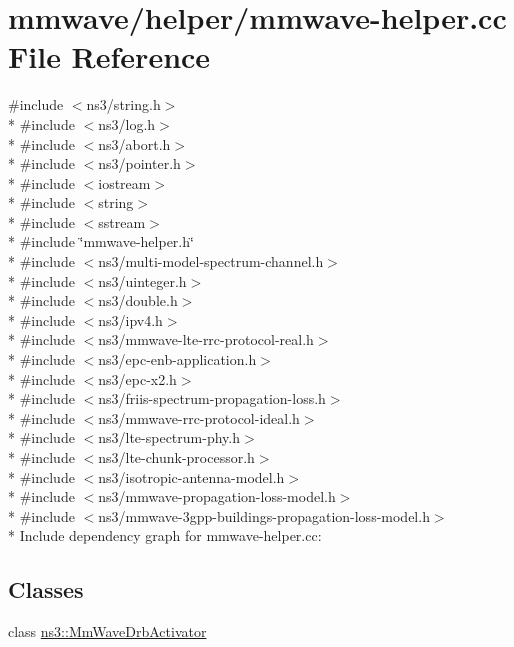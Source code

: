 \hypertarget{mmwave-helper_8cc}{}\section{mmwave/helper/mmwave-\/helper.cc File Reference}
\label{mmwave-helper_8cc}
{\ttfamily \#include $<$ns3/string.\+h$>$}\\*
{\ttfamily \#include $<$ns3/log.\+h$>$}\\*
{\ttfamily \#include $<$ns3/abort.\+h$>$}\\*
{\ttfamily \#include $<$ns3/pointer.\+h$>$}\\*
{\ttfamily \#include $<$iostream$>$}\\*
{\ttfamily \#include $<$string$>$}\\*
{\ttfamily \#include $<$sstream$>$}\\*
{\ttfamily \#include \char`\"{}mmwave-\/helper.\+h\char`\"{}}\\*
{\ttfamily \#include $<$ns3/multi-\/model-\/spectrum-\/channel.\+h$>$}\\*
{\ttfamily \#include $<$ns3/uinteger.\+h$>$}\\*
{\ttfamily \#include $<$ns3/double.\+h$>$}\\*
{\ttfamily \#include $<$ns3/ipv4.\+h$>$}\\*
{\ttfamily \#include $<$ns3/mmwave-\/lte-\/rrc-\/protocol-\/real.\+h$>$}\\*
{\ttfamily \#include $<$ns3/epc-\/enb-\/application.\+h$>$}\\*
{\ttfamily \#include $<$ns3/epc-\/x2.\+h$>$}\\*
{\ttfamily \#include $<$ns3/friis-\/spectrum-\/propagation-\/loss.\+h$>$}\\*
{\ttfamily \#include $<$ns3/mmwave-\/rrc-\/protocol-\/ideal.\+h$>$}\\*
{\ttfamily \#include $<$ns3/lte-\/spectrum-\/phy.\+h$>$}\\*
{\ttfamily \#include $<$ns3/lte-\/chunk-\/processor.\+h$>$}\\*
{\ttfamily \#include $<$ns3/isotropic-\/antenna-\/model.\+h$>$}\\*
{\ttfamily \#include $<$ns3/mmwave-\/propagation-\/loss-\/model.\+h$>$}\\*
{\ttfamily \#include $<$ns3/mmwave-\/3gpp-\/buildings-\/propagation-\/loss-\/model.\+h$>$}\\*
Include dependency graph for mmwave-\/helper.cc\+:
\subsection*{Classes}
\begin{DoxyCompactItemize}
\item 
class \hyperlink{classns3_1_1MmWaveDrbActivator}{ns3\+::\+Mm\+Wave\+Drb\+Activator}
\end{DoxyCompactItemize}
